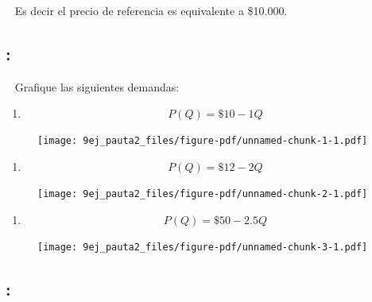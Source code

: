\documentclass[
  letterpaper,
  DIV=11,
  numbers=noendperiod]{scrreport}
\providecommand{\tightlist}{%
  \setlength{\itemsep}{0pt}\setlength{\parskip}{0pt}}\usepackage{longtable,booktabs,array}
\begin{document}
~ Es decir el precio de referencia es equivalente a \$10.000.

\newpage

\hypertarget{section-26}{%
\subsection{:}\label{section-26}}

~ Grafique las siguientes demandas:

\begin{enumerate}
\def\labelenumi{\arabic{enumi})}
\tightlist
\item
  \[
  P(Q)=\$10 - 1Q
  \]
\end{enumerate}

\begin{figure}

{\centering \texttt{[image: 9ej\_pauta2\_files/figure-pdf/unnamed-chunk-1-1.pdf]}

}

\end{figure}

\newpage

\begin{enumerate}
\def\labelenumi{\arabic{enumi})}
\setcounter{enumi}{1}
\tightlist
\item
  \[
  P(Q)=\$12 - 2Q
  \]
\end{enumerate}

\begin{figure}

{\centering \texttt{[image: 9ej\_pauta2\_files/figure-pdf/unnamed-chunk-2-1.pdf]}

}

\end{figure}

\newpage

\begin{enumerate}
\def\labelenumi{\arabic{enumi})}
\setcounter{enumi}{2}
\tightlist
\item
  \[
  P(Q)=\$50 - 2.5Q
  \]
\end{enumerate}

\begin{figure}

{\centering \texttt{[image: 9ej\_pauta2\_files/figure-pdf/unnamed-chunk-3-1.pdf]}

}

\end{figure}

\newpage

\hypertarget{section-27}{%
\subsection{:}\label{section-27}}
\end{document}
